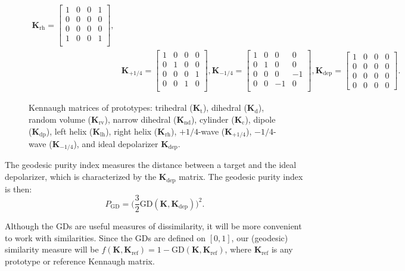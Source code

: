 \documentclass[journal]{IEEEtran}
\begin{document}
\begin{figure}
\[\begin{split}
%
\bm K_{\text{rh}}=
\begin{bmatrix}
1 & 0 & 0 & 1\\
0 & 0 & 0 & 0\\
0 & 0 & 0 & 0\\
1 & 0 & 0 & 1\\
\end{bmatrix},\\
%
&\bm K_{+1/4}=
\begin{bmatrix}
1 & 0 & 0 & 0\\
0 & 1 & 0 & 0\\
0 & 0 & 0 & 1\\
0 & 0 & 1 & 0\\
\end{bmatrix},
%
\bm K_{-1/4}=
\begin{bmatrix}
1 & 0 & 0 & 0\\
0 & 1 & 0 & 0\\
0 & 0 & 0 & -1\\
0 & 0 & -1 & 0\\
\end{bmatrix},
%
\bm{K}_{\text{dep}} =
\begin{bmatrix}
1 & 0 & 0 & 0\\
0 & 0 & 0 & 0\\
0 & 0 & 0 & 0\\
0 & 0 & 0 & 0
\end{bmatrix}.
\end{split}
\]
\caption{Kennaugh matrices of prototypes: {trihedral} ($\bm K_\text{t}$), 
	{dihedral} ($\bm K_{\text{d}}$), 
	{random volume} ($\bm K_{\text{rv}}$), 
	{narrow dihedral} ($\bm K_{\text{nd}}$), 
	{cylinder}  ($\bm K_{\text{c}}$), 
	{dipole}  ($\bm K_{\text{dp}}$), 
	{left helix} ($\bm K_{\text{lh}}$), 
	{right helix} ($\bm K_{\text{rh}}$), 
	{$+1/4$-wave} ($\bm K_{+1/4}$), 
 {$-1/4$-wave} ($\bm K_{-1/4}$), and ideal depolarizer $\bm K_{\text{dep}}$.}
\label{fig:ElementaryK}
\end{figure}

The geodesic purity index measures the distance between a target and the ideal depolarizer, which is characterized by the $\bm{K}_{\text{dep}}$ matrix.
The geodesic purity index is then:
\begin{equation}
P_{\text{GD}} = \Big(\frac{3}{2}\text{GD}(\bm{K}, \bm{K}_{\text{dep}})\Big)^2.
\end{equation}

Although the $\text{GD}$s are useful measures of dissimilarity, it will be more convenient to work with similarities.
Since the $\text{GD}$s are defined on $[0,1]$, our (geodesic) similarity measure will be $f(\bm{K}, \bm{K}_{\text{ref}}) = 1-\text{GD}(\bm{K}, \bm{K}_{\text{ref}})$, where $\bm{K}_{\text{ref}}$ is any prototype or reference Kennaugh matrix.
\end{document}
